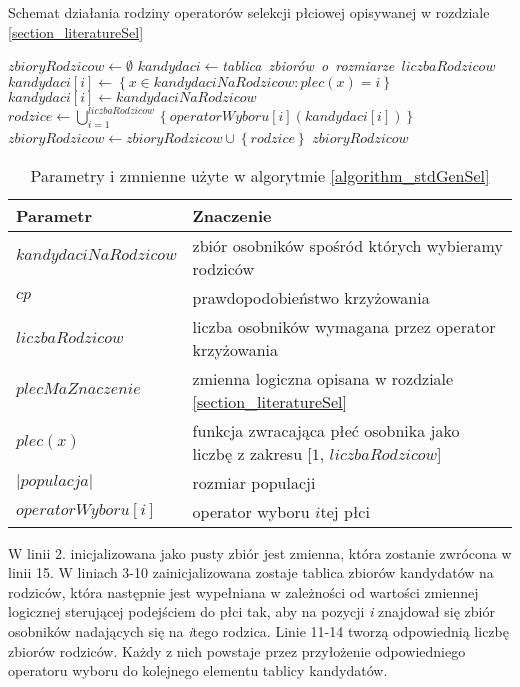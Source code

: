 \documentclass[twoside]{iisthesis}
\begin{document}
\begin{algorithm}
	\caption{Schemat działania rodziny operatorów selekcji płciowej opisywanej w rozdziale \ref{section_literatureSel}}
	\label{algorithm_stdGenSel}
	\begin{algorithmic}[1]
		\Var $zbioryRodzicow \gets \emptyset$
		\Var $kandydaci \gets $\textit{tablica\ zbiorów\ o\ rozmiarze\ }$liczbaRodzicow$
		\State $kandydaci[i] \gets \left\{  x \in kandydaciNaRodzicow : plec(x) = i \right\}$
		\Else
		\State $kandydaci[i] \gets kandydaciNaRodzicow$
		\EndIf
		\EndFor
		\Var $rodzice \gets \bigcup_{i=1}^{liczbaRodzicow} \left\{ operatorWyboru[i](kandydaci[i]) \right\} $
		\State $zbioryRodzicow \gets zbioryRodzicow\cup \left\{ rodzice \right\}$
		\EndWhile
		\State \Return $zbioryRodzicow$
		\EndFunction
	\end{algorithmic}
\end{algorithm}

\begin{table}
	\caption{Parametry i zmnienne użyte w algorytmie \ref{algorithm_stdGenSel}}
	\label{table_stdGenSel}
	\begin{tabularx}{\linewidth}{lX}
		\hline
		\textbf{Parametr} & \textbf{Znaczenie} \\
		\hline
		\hline
		$kandydaciNaRodzicow$ & zbiór osobników spośród których wybieramy rodziców \\
		\hline
		$cp$ & prawdopodobieństwo krzyżowania \\
		\hline
		$liczbaRodzicow$ & liczba osobników wymagana przez operator krzyżowania \\
		\hline
		$plecMaZnaczenie$ & zmienna logiczna opisana w rozdziale \ref{section_literatureSel} \\
		\hline
		$plec(x)$ & funkcja zwracająca płeć osobnika jako liczbę z zakresu [$1$, $liczbaRodzicow$] \\
		\hline
		$|populacja|$ & rozmiar populacji \\
		\hline
		$operatorWyboru[i]$ & operator wyboru $i$tej płci \\
		\hline
	\end{tabularx}
\end{table}

W linii 2. inicjalizowana jako pusty zbiór jest zmienna, która zostanie zwrócona w linii 15.
W liniach 3-10 zainicjalizowana zostaje tablica zbiorów kandydatów na rodziców, która następnie jest wypełniana w zależności od wartości zmiennej logicznej sterującej podejściem do płci tak, aby na pozycji \textit{i} znajdował się zbiór osobników nadających się na \textit{i}tego rodzica.
Linie 11-14 tworzą odpowiednią liczbę zbiorów rodziców. Każdy z nich powstaje przez przyłożenie odpowiedniego operatoru wyboru do kolejnego elementu tablicy kandydatów.
\end{document}
